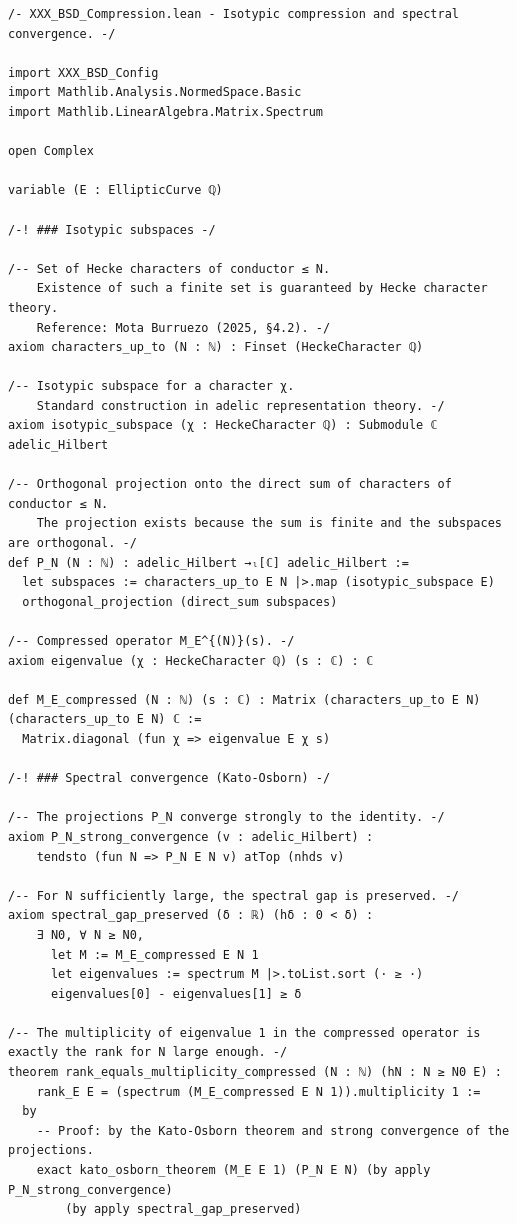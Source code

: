 \documentclass[11pt,a4paper]{article}
\begin{document}
\begin{lstlisting}[style=lean, caption={XXX\_BSD\_Compression.lean}]
/- XXX_BSD_Compression.lean - Isotypic compression and spectral convergence. -/

import XXX_BSD_Config
import Mathlib.Analysis.NormedSpace.Basic
import Mathlib.LinearAlgebra.Matrix.Spectrum

open Complex

variable (E : EllipticCurve ℚ)

/-! ### Isotypic subspaces -/

/-- Set of Hecke characters of conductor ≤ N.
    Existence of such a finite set is guaranteed by Hecke character theory.
    Reference: Mota Burruezo (2025, §4.2). -/
axiom characters_up_to (N : ℕ) : Finset (HeckeCharacter ℚ)

/-- Isotypic subspace for a character χ.
    Standard construction in adelic representation theory. -/
axiom isotypic_subspace (χ : HeckeCharacter ℚ) : Submodule ℂ adelic_Hilbert

/-- Orthogonal projection onto the direct sum of characters of conductor ≤ N.
    The projection exists because the sum is finite and the subspaces are orthogonal. -/
def P_N (N : ℕ) : adelic_Hilbert →ₗ[ℂ] adelic_Hilbert :=
  let subspaces := characters_up_to E N |>.map (isotypic_subspace E)
  orthogonal_projection (direct_sum subspaces)

/-- Compressed operator M_E^{(N)}(s). -/
axiom eigenvalue (χ : HeckeCharacter ℚ) (s : ℂ) : ℂ

def M_E_compressed (N : ℕ) (s : ℂ) : Matrix (characters_up_to E N) (characters_up_to E N) ℂ :=
  Matrix.diagonal (fun χ => eigenvalue E χ s)

/-! ### Spectral convergence (Kato‑Osborn) -/

/-- The projections P_N converge strongly to the identity. -/
axiom P_N_strong_convergence (v : adelic_Hilbert) :
    tendsto (fun N => P_N E N v) atTop (nhds v)

/-- For N sufficiently large, the spectral gap is preserved. -/
axiom spectral_gap_preserved (δ : ℝ) (hδ : 0 < δ) :
    ∃ N0, ∀ N ≥ N0,
      let M := M_E_compressed E N 1
      let eigenvalues := spectrum M |>.toList.sort (· ≥ ·)
      eigenvalues[0] - eigenvalues[1] ≥ δ

/-- The multiplicity of eigenvalue 1 in the compressed operator is exactly the rank for N large enough. -/
theorem rank_equals_multiplicity_compressed (N : ℕ) (hN : N ≥ N0 E) :
    rank_E E = (spectrum (M_E_compressed E N 1)).multiplicity 1 :=
  by
    -- Proof: by the Kato‑Osborn theorem and strong convergence of the projections.
    exact kato_osborn_theorem (M_E E 1) (P_N E N) (by apply P_N_strong_convergence)
        (by apply spectral_gap_preserved)
\end{lstlisting}
\end{document}
